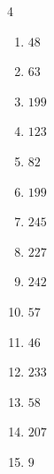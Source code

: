 \begin{multicols}{4}
\begin{enumerate}
\columnbreak %

  \item $48$


  \item $63$


  \item $199$


  \item $123$


  \item $82$


  \item $199$


  \item $245$


  \item $227$


  \item $242$


  \item $57$


  \item $46$


  \item $233$


  \item $58$


  \item $207$


  \item $9$


\columnbreak %


\end{enumerate}
\end{multicols}
